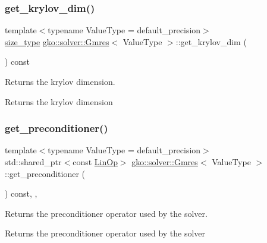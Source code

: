 \subsubsection{\texorpdfstring{get\+\_\+krylov\+\_\+dim()}{get\_krylov\_dim()}}
{\footnotesize\ttfamily template$<$typename Value\+Type  = default\+\_\+precision$>$ \\
\hyperlink{namespacegko_a6e5c95df0ae4e47aab2f604a22d98ee7}{size\+\_\+type} \hyperlink{classgko_1_1solver_1_1Gmres}{gko\+::solver\+::\+Gmres}$<$ Value\+Type $>$\+::get\+\_\+krylov\+\_\+dim (\begin{DoxyParamCaption}{ }\end{DoxyParamCaption}) const\hspace{0.3cm}{\ttfamily [inline]}}



Returns the krylov dimension. 

\begin{DoxyReturn}{Returns}
the krylov dimension 
\end{DoxyReturn}
\mbox{\label{classgko_1_1solver_1_1Gmres_ac2e3e0024a37647eda9f8a7f5b4cefb4}} 
\subsubsection{\texorpdfstring{get\+\_\+preconditioner()}{get\_preconditioner()}}
{\footnotesize\ttfamily template$<$typename Value\+Type  = default\+\_\+precision$>$ \\
std\+::shared\+\_\+ptr$<$const \hyperlink{classgko_1_1LinOp}{Lin\+Op}$>$ \hyperlink{classgko_1_1solver_1_1Gmres}{gko\+::solver\+::\+Gmres}$<$ Value\+Type $>$\+::get\+\_\+preconditioner (\begin{DoxyParamCaption}{ }\end{DoxyParamCaption}) const\hspace{0.3cm}{\ttfamily [inline]}, {\ttfamily [override]}, {\ttfamily [virtual]}}



Returns the preconditioner operator used by the solver. 

\begin{DoxyReturn}{Returns}
the preconditioner operator used by the solver 
\end{DoxyReturn}


